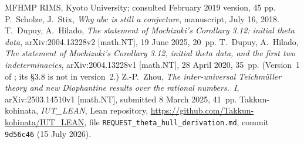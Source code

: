 \documentclass[11pt]{article}
\theoremstyle{plain}
\theoremstyle{definition}
\begin{document}
\begin{thebibliography}{MFHMP}
 RIMS, Kyoto University; consulted February 2019 version, 45 pp.
 P.~Scholze, J.~Stix, \emph{Why $abc$ is still a conjecture},
 manuscript, July 16, 2018.
 T.~Dupuy, A.~Hilado,
\emph{The statement of Mochizuki's Corollary 3.12: initial theta data},
arXiv:2004.13228v2 [math.NT], 19 June 2025, 20~pp.
 T.~Dupuy, A.~Hilado,
\emph{The statement of Mochizuki's Corollary 3.12, initial theta data, and the
first two indeterminacies}, arXiv:2004.13228v1 [math.NT], 28 April 2020, 35~pp.
(Version~1 of \cite{DH25}; its \S3.8 is not in version~2.)
 Z.-P.~Zhou,
\emph{The inter-universal Teichm\"uller theory and new Diophantine
results over the rational numbers.~I},
arXiv:2503.14510v1 [math.NT], submitted 8 March 2025, 41~pp.
 Takkun-kohinata, \emph{IUT\_LEAN}, Lean repository,
\url{https://github.com/Takkun-kohinata/IUT_LEAN}, file
\texttt{REQUEST\_theta\_hull\_derivation.md}, commit \texttt{9d56c46}
(15 July 2026).
\end{thebibliography}
\end{document}
